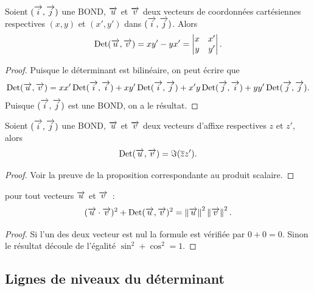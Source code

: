 \begin{prop}
  Soient \((\vi , \vj)\) une BOND, \(\vu\) et \(\vv\) deux vecteurs de 
  coordonnées cartésiennes respectives \((x , y)\) et \((x',y')\) dans \((\vi , 
  \vj)\). Alors \begin{equation}
    \Det(\vu , \vv) = xy'-yx' = \begin{vmatrix} x&x'\\y&y'\end{vmatrix}.
  \end{equation}
\end{prop}

\begin{proof}
  Puisque le déterminant est bilinéaire, on peut écrire que
  \begin{equation}
    \Det(\vu , \vv) = xx' \Det(\vi , \vi) + xy' \Det(\vi , \vj) + x'y\Det(\vj , 
    \vi) + yy'\Det(\vj , \vj).
  \end{equation}
  Puisque \((\vi , \vj)\) est une BOND, on a le résultat.
\end{proof}

\begin{prop}
  Soient \((\vi , \vj)\) une BOND, \(\vu\) et \(\vv\) deux vecteurs d'affixe 
  respectives \(z\) et \(z'\), alors \begin{equation}
    \Det(\vu , \vv) = \Im(\bar{z}z').
  \end{equation}
\end{prop}

\begin{proof}
  Voir la preuve de la proposition correspondante au produit scalaire.
\end{proof}

\begin{prop}
  pour tout vecteurs \(\vu\) et \(\vv\)~:
  \begin{equation}
    (\vu \cdot \vv)^2 + \Det(\vu , \vv)^2 = \norme{\vu}^2 \norme{\vv}^2.
  \end{equation}
\end{prop}

\begin{proof}
  Si l'un des deux vecteur est nul la formule est vérifiée par \(0 + 0 = 0\).  
  Sinon le résultat découle de l'égalité \(\sin^2 + \cos^2 = 1\).
\end{proof}

\subsection{Lignes de niveaux du déterminant}

